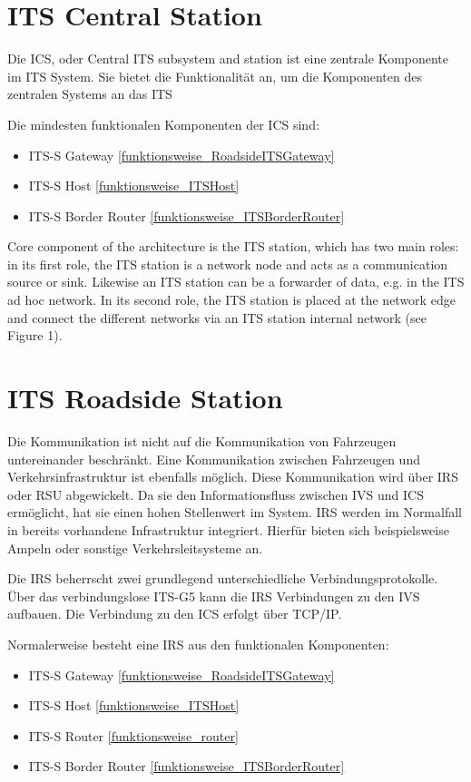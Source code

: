 \section{ITS Central Station}
Die \ac{ICS}, oder Central \ac{ITS} subsystem and station ist eine zentrale Komponente im \ac{ITS} System. Sie bietet die Funktionalität an, um die Komponenten des zentralen Systems an das \ac{ITS} 

Die mindesten funktionalen Komponenten der \ac{ICS} sind:
\begin{itemize}
	\item \ac{ITS-S} Gateway \ref{funktionsweise_RoadsideITSGateway}
	\item \ac{ITS-S} Host \ref{funktionsweise_ITSHost}
	\item \ac{ITS-S} Border Router \ref{funktionsweise_ITSBorderRouter}
\end{itemize}


Core component of the architecture is the ITS station, which has two main roles: in its first role, the ITS station is a network node and acts as a communication source or sink. Likewise an ITS station can be a forwarder of data, e.g. in the ITS ad hoc network. In its second role, the ITS station is placed at the network edge and connect the different networks via an ITS station internal network (see Figure 1). \cite{etsi302636-3}

	
	
\section{ITS Roadside Station}
Die Kommunikation ist nicht auf die Kommunikation von Fahrzeugen untereinander beschränkt. Eine Kommunikation zwischen Fahrzeugen und Verkehrsinfrastruktur ist ebenfalls möglich. Diese Kommunikation wird über \ac{IRS} oder \ac{RSU} abgewickelt. Da sie den Informationsfluss zwischen \ac{IVS} und \ac{ICS} ermöglicht, hat sie einen hohen Stellenwert im System. \ac{IRS} werden im Normalfall in bereits vorhandene Infrastruktur integriert. Hierfür bieten sich beispielsweise Ampeln oder sonstige Verkehrsleitsysteme an. 

Die \ac{IRS} beherrscht zwei grundlegend unterschiedliche Verbindungsprotokolle. Über das verbindungslose ITS-G5 kann die \ac{IRS} Verbindungen zu den \ac{IVS} aufbauen. Die Verbindung zu den \ac{ICS} erfolgt über TCP/IP. 

Normalerweise besteht eine \ac{IRS} aus den funktionalen Komponenten: 
\begin{itemize}
	\item  \ac{ITS-S} Gateway \ref{funktionsweise_RoadsideITSGateway}
	\item \ac{ITS-S} Host \ref{funktionsweise_ITSHost}
	\item \ac{ITS-S} Router \ref{funktionsweise_router}
	\item \ac{ITS-S} Border Router \ref{funktionsweise_ITSBorderRouter}
\end{itemize}

